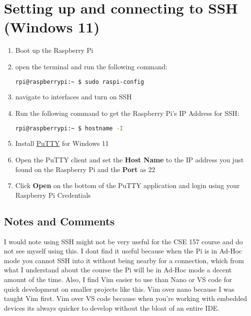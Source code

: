 \documentclass{article}
\begin{document}
    \section{Setting up and connecting to SSH (Windows 11)}
    \begin{enumerate}
        \item Boot up the Raspberry Pi 
        \item open the terminal and run the following command: 
        \begin{lstlisting}[language=bash]
            rpi@raspberrypi:~ $ sudo raspi-config
            \end{lstlisting}
        \item navigate to interfaces and turn on SSH 
        \item Run the following command to get the Raspberry Pi's IP Address for SSH:
            \begin{lstlisting}[language=bash]
            rpi@raspberrypi:~ $ hostname -I
            \end{lstlisting}
        \item Install \href{https://www.chiark.greenend.org.uk/~sgtatham/putty/latest.html}{PuTTY} for Windows 11
        \item Open the PuTTY client and set the \textbf{Host Name} to the IP address you just found on the Raspberry Pi and the \textbf{Port} as 22
        \item Click \textbf{Open} on the bottom of the PuTTY application and login using your Raspberry Pi Credentials
    \end{enumerate}
    \subsection{Notes and Comments}
    I would note using SSH might not be very useful for the CSE 157 course and do not see myself using this. I dont find it 
    useful because when the Pi is in Ad-Hoc mode you cannot SSH into it without being nearby for a connection, which from what I understand about the course 
    the Pi will be in Ad-Hoc mode a decent amount of the time. Also, I find Vim easier to use than Nano or VS code for quick development 
    on smaller projects like this. Vim over nano because I was taught Vim first. Vim over VS code because when you're working with embedded 
    devices its always quicker to develop without the bloat of an entire IDE. 

\end{document}

